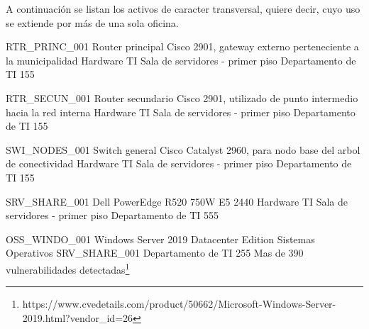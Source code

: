 A continuación se listan los activos de caracter transversal, quiere decir, cuyo uso se extiende por más de una sola oficina.

\informationResource
{RTR\_PRINC\_001}
{Router principal Cisco 2901, gateway externo perteneciente a la municipalidad}
{Hardware TI}
{Sala de servidores - primer piso}
{Departamento de TI}
{1}{5}{5}
{
	\threatResourceLost
	\threatHumanIntervention
	\threatRemoteIntervention
	\threatNaturalDisaster
	\threatHumanDisaster
}

\informationResource
{RTR\_SECUN\_001}
{Router secundario Cisco 2901, utilizado de punto intermedio hacia la red interna}
{Hardware TI}
{Sala de servidores - primer piso}
{Departamento de TI}
{1}{5}{5}
{
	\threatResourceLost
	\threatHumanIntervention
	\threatRemoteIntervention
	\threatNaturalDisaster
	\threatHumanDisaster
}

\informationResource
{SWI\_NODES\_001}
{Switch general Cisco Catalyst 2960, para nodo base del arbol de conectividad}
{Hardware TI}
{Sala de servidores - primer piso}
{Departamento de TI}
{1}{5}{5}
{
	\threatResourceLost
	\threatHumanIntervention
	\threatRemoteIntervention
	\threatNaturalDisaster
	\threatHumanDisaster
}

\informationResource
{SRV\_SHARE\_001}
{Dell PowerEdge R520 750W E5 2440}
{Hardware TI}
{Sala de servidores - primer piso}
{Departamento de TI}
{5}{5}{5}
{
	\threatHumanIntervention
	\threatRemoteIntervention
	\threatNaturalDisaster
	\threatHumanDisaster
	\threatInterest
}


\informationResource
{OSS\_WINDO\_001}
{Windows Server 2019 Datacenter Edition}
{Sistemas Operativos}
{SRV_SHARE_001}
{Departamento de TI}
{2}{5}{5}
{
	Mas de 390 vulnerabilidades detectadas\footnote{https://www.cvedetails.com/product/50662/Microsoft-Windows-Server-2019.html?vendor_id=26}\\
	\threatHumanIntervention
	\threatRemoteIntervention
	\threatLicenceDependant
	\threatAntivirus
}


